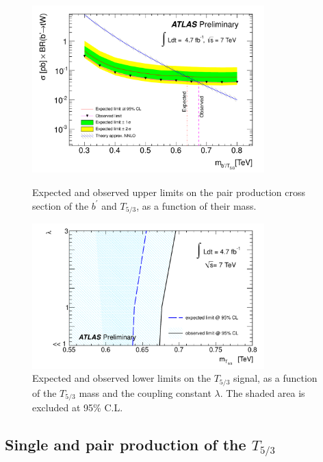 \begin{figure}[t]  
  \begin{center}
    \includegraphics[width=0.8\textwidth]{figures/samesign/Limit_bprime_final_obs_CS}
    \caption{Expected and observed upper limits on the pair production cross section 
        of the $b^\prime$ and $T_{5/3}$, as a function of their mass.}
    \label{limit:bprime}

    \vspace{1cm}

    \includegraphics[width=0.8\textwidth]{figures/samesign/limit_observed_T53}
    \caption{Expected and observed lower limits on the $T_{5/3}$ signal, as a function 
        of the $T_{5/3}$ mass and the coupling constant $\lambda$. The shaded area  is excluded 
        at 95\% C.L.}
    \label{limit:t53}
  \end{center}
\end{figure}


\subsection{Single and pair production of the $T_{5/3}$}

